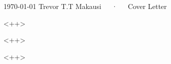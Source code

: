 \documentclass[11pt, a4paper]{classes/awesome-cv}
\begin{document}
\makecvheader[R]

\makecvfooter
  {\today}
  {Trevor T.T Makausi~~~·~~~Cover Letter}
  {}

\makelettertitle

\begin{cvletter}

<++>


<++>

<++>


\end{cvletter}


\makeletterclosing
\end{document}
